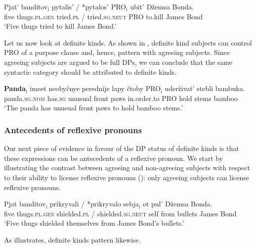 \documentclass[output=paper
,modfonts
,nonflat]{langsci/langscibook}
\begin{document}
	\ea\label{ex:borik:16}
	\gll {\ob}Pjat' 	banditov{\cb}\textnormal{$_\text{i}$} pytalis'  \textnormal{/} \textnormal{*}pytalos'  {\ob}\textnormal{PRO$_\text{i}$} 	ubit' 	D\v{z}emsa 	Bonda{\cb}.\\
	{\db}five 	thugs.\textsc{pl.gen} 	tried.\textsc{pl} / \phantom{*}tried.\textsc{sg.neut} {\db}PRO to.kill 	James 	Bond\\
	\glt `Five thugs tried to kill James Bond.'
	\z
	
	Let us now look at definite kinds. As shown in , definite kind subjects can control PRO of a purpose clause and, hence, pattern with agreeing subjects. Since agreeing subjects are argued to be full DPs, we can conclude that the same syntactic category should be attributed to definite kinds. 
	
	\ea\label{ex:borik:17}
	\gll \textbf{Panda}\textnormal{$_\text{i}$} imeet neoby\v{c}nye perednije lapy 	\v{c}toby  \textnormal{PRO$_\text{i}$}	uder\v{z}ivat' stebli bambuka.\\
	panda.\textsc{sg.nom} has.\textsc{sg} unusual front 	paws in.order.to PRO hold stems bamboo\\
	\glt `The panda has unusual front paws to hold bamboo stems.' 
	\z
	
	\subsubsection{Antecedents of reflexive pronouns}
	
	Our next piece of evidence in favour of the DP status of definite kinds is that these expressions can be antecedents of a reflexive pronoun. We start by illustrating the contrast between agreeing and non-agreeing subjects with respect to their ability to license reflexive pronouns (\citealt[455, ex. 11a]{Pereltsvaig2006}): only agreeing subjects can license reflexive pronouns. 
	
	\ea \label{ex:borik:18}
	\gll {\ob}Pjat 	banditov{\cb}\textnormal{$_\text{i}$} 	prikryvali \textnormal{/} \textnormal{*}prikryvalo sebja\textnormal{$_\text{i}$} ot pul' D\v{z}emsa 	Bonda.\\
	{\db}five 	thugs.\textsc{pl.gen} 	shielded.\textsc{pl} / \phantom{*}shielded.\textsc{sg.neut} self from bullets James Bond\\
	\glt		`Five thugs shielded themselves from James Bond's bullets.'
	\z
	
	As  illustrates, definite kinds pattern likewise.
	
\end{document}
